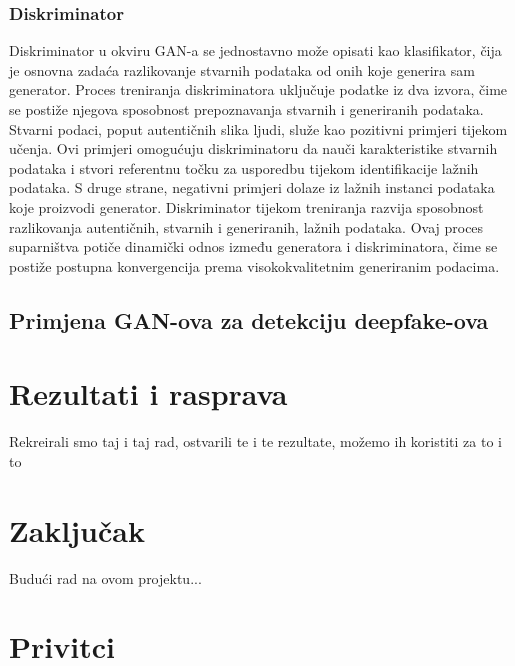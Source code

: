 \documentclass[seminarski, times, utf8]{fer}
\begin{document}
\subsection{Diskriminator}
Diskriminator u okviru GAN-a se jednostavno može opisati kao klasifikator, čija je osnovna zadaća razlikovanje stvarnih podataka od onih koje generira sam generator. Proces treniranja diskriminatora uključuje podatke iz dva izvora, čime se postiže njegova sposobnost prepoznavanja stvarnih i generiranih podataka. Stvarni podaci, poput autentičnih slika ljudi, služe kao pozitivni primjeri tijekom učenja. Ovi primjeri omogućuju diskriminatoru da nauči karakteristike stvarnih podataka i stvori referentnu točku za usporedbu tijekom identifikacije lažnih podataka. S druge strane, negativni primjeri dolaze iz lažnih instanci podataka koje proizvodi generator. Diskriminator tijekom treniranja razvija sposobnost razlikovanja autentičnih, stvarnih i generiranih, lažnih podataka. Ovaj proces suparništva potiče dinamički odnos između generatora i diskriminatora, čime se postiže postupna konvergencija prema visokokvalitetnim generiranim podacima.

\section {Primjena GAN-ova za detekciju deepfake-ova}

\chapter{Rezultati i rasprava}
\label{pog:rezultati_i_rasprava}
Rekreirali smo taj i taj rad, ostvarili te i te rezultate, možemo ih koristiti za to i to



\chapter{Zaključak}
Budući rad na ovom projektu...
\label{pog:zakljucak}







\chapter{Privitci}
\end{document}
